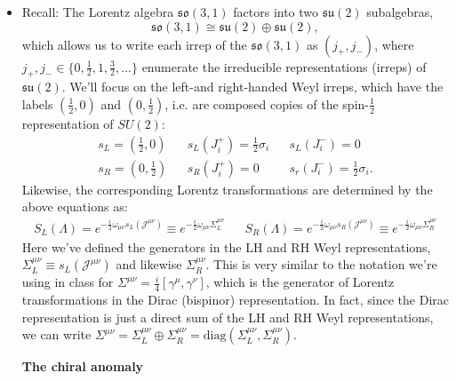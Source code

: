 \documentclass[12pt, oneside]{article}   	%
\theoremstyle{definition}
\begin{document}
\begin{itemize}
	
	\item Recall: The Lorentz algebra $\mathfrak{so}(3, 1)$ factors into two $\mathfrak{su}(2)$ subalgebras,
	\begin{equation}
		\mathfrak{so}(3, 1)\cong \mathfrak{su}(2)\oplus \mathfrak{su}(2),
	\end{equation}
	which allows us to write each irrep of the $\mathfrak{so}(3, 1)$ as $(j_+, j_-)$, where $j_+, j_-\in \{0, \frac{1}{2}, 1, \frac{3}{2}, ...\}$ enumerate the irreducible representations (irreps) of $\mathfrak{su}(2)$. We'll focus on the left-and right-handed Weyl irreps, which have the labels $(\frac{1}{2}, 0)$ and $(0, \frac{1}{2})$, i.e. are composed copies of the spin-$\frac{1}{2}$ representation of $SU(2)$:
	\begin{align} 
		s_L = \left(\frac{1}{2}, 0\right) && s_L(J_i^+) = \frac{1}{2} \sigma_i && s_L(J_i^-) = 0 \\
		s_R = \left(0, \frac{1}{2}\right) && s_R(J_i^+) = 0 && s_r(J_i^-) = \frac{1}{2} \sigma_i.
	\end{align}
	Likewise, the corresponding Lorentz transformations are determined by the above equations as:
	\begin{align}
		S_L(\Lambda) = e^{-\frac{i}{2}\omega_{\mu\nu} s_L(\mathcal J^{\mu\nu})} \equiv e^{-\frac{i}{2} \omega_{\mu\nu} \Sigma_L^{\mu\nu}} && S_R(\Lambda) = e^{-\frac{i}{2}\omega_{\mu\nu} s_R(\mathcal J^{\mu\nu})} \equiv e^{-\frac{i}{2} \omega_{\mu\nu} \Sigma_R^{\mu\nu}}
	\end{align}
	Here we've defined the generators in the LH and RH Weyl representations, $\Sigma_L^{\mu\nu}\equiv s_L(\mathcal J^{\mu\nu})$ and likewise $\Sigma_R^{\mu\nu}$. This is very similar to the notation we're using in class for $\Sigma^{\mu\nu} = \frac{i}{4} [\gamma^\mu, \gamma^\nu]$, which is the generator of Lorentz transformations in the Dirac (bispinor) representation. In fact, since the Dirac representation is just a direct sum of the LH and RH Weyl representations, we can write $\Sigma^{\mu\nu} = \Sigma_L^{\mu\nu}\oplus \Sigma_R^{\mu\nu} = \mathrm{diag}(\Sigma_L^{\mu\nu}, \Sigma_R^{\mu\nu})$.
	
	\begin{answerbox}
		{\centering \textbf{The chiral anomaly} } \\
	

\end{answerbox}
\end{itemize}
\end{document}
